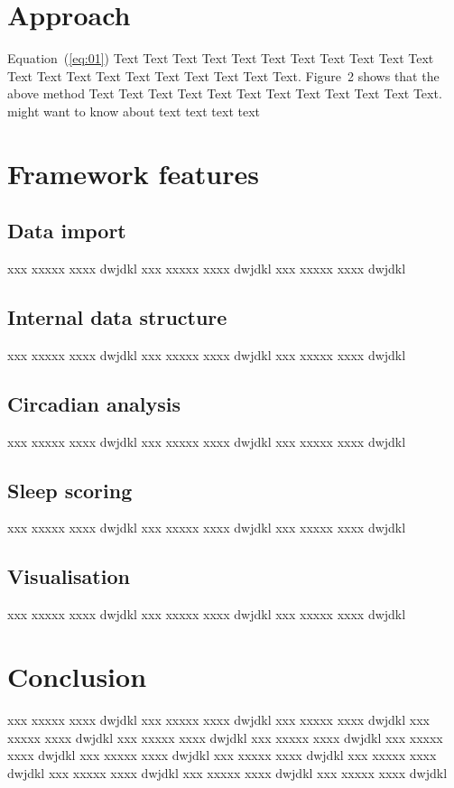 \documentclass{bioinfo}
\begin{document}

\section{Approach}

Equation~(\ref{eq:01}) Text Text Text Text Text Text  Text Text
Text Text Text Text Text Text Text Text Text Text Text Text Text.
Figure~2\vphantom{\ref{fig:02}} shows that the above method  Text
Text Text Text  Text Text Text Text Text Text  Text Text.
\citealp{Boffelli03} might want to know about text text text text


\section{Framework  features}
\subsection{Data import}
xxx xxxxx xxxx dwjdkl xxx xxxxx xxxx dwjdkl xxx xxxxx xxxx dwjdkl 
\subsection{Internal data structure}
xxx xxxxx xxxx dwjdkl xxx xxxxx xxxx dwjdkl xxx xxxxx xxxx dwjdkl 
\subsection{Circadian analysis}
xxx xxxxx xxxx dwjdkl xxx xxxxx xxxx dwjdkl xxx xxxxx xxxx dwjdkl 
\subsection{Sleep scoring}
xxx xxxxx xxxx dwjdkl xxx xxxxx xxxx dwjdkl xxx xxxxx xxxx dwjdkl 
\subsection{Visualisation}
xxx xxxxx xxxx dwjdkl xxx xxxxx xxxx dwjdkl xxx xxxxx xxxx dwjdkl 


\section{Conclusion}

xxx xxxxx xxxx dwjdkl xxx xxxxx xxxx dwjdkl xxx xxxxx xxxx dwjdkl xxx xxxxx xxxx dwjdkl xxx xxxxx xxxx dwjdkl 
xxx xxxxx xxxx dwjdkl xxx xxxxx xxxx dwjdkl xxx xxxxx xxxx dwjdkl xxx xxxxx xxxx dwjdkl xxx xxxxx xxxx dwjdkl 
xxx xxxxx xxxx dwjdkl xxx xxxxx xxxx dwjdkl xxx xxxxx xxxx dwjdkl 
\end{document}
